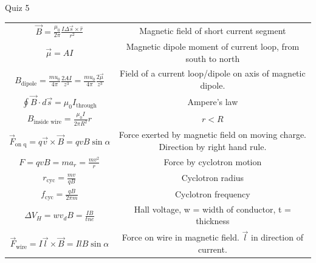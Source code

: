 \documentclass{article}
\begin{document}
\begin{center}
\begin{section}{Quiz 5}
\begin{tabular}{|c|c|}
		 $\vec B = \frac{\mu_0}{2 \pi} \frac{I \Delta \vec s \times \hat r}{r^2}$ & Magnetic field of short current segment                            \\


		 $\vec \mu = AI$                                                          & Magnetic dipole moment of current loop, from south to north        \\

		 $B_\text{dipole} = \frac{mu_0}{4 \pi} \frac{2 A I}{z^3}
		 = \frac{mu_0}{4 \pi} \frac{2 \vec \mu}{z^3}$                             & Field of a current loop/dipole on axis of magnetic dipole.         \\

		 $\oint \vec B \cdot d \vec s = \mu_0 I_\text{through}$                   & Ampere's law                                                       \\

		 $B_\text{inside wire} = \frac{\mu_0 I}{2 \pi R^2} r$                     & $r < R$                                                            \\

		 $\vec F_\text{on q} = q \vec v \times \vec B = qvB \sin \alpha $         & \makecell{Force exerted by magnetic field on moving charge.        \\
		 Direction by right hand rule. }                                                                                                               \\

		 $F = qvB = ma_r = \frac{mv^2}{r}$                                        & Force by cyclotron motion                                          \\

		 $r_\text{cyc} = \frac{mv}{qB}$                                           & Cyclotron radius                                                   \\

		 $f_\text{cyc} = \frac{qB}{2 \pi m}$                                      & Cyclotron frequency                                                \\

		 $\Delta V_H = w v_d B = \frac{IB}{tne}$                                  & Hall voltage, w = width of conductor, t = thickness                \\

		 $\vec F_\text{wire} = I \vec l \times \vec B = IlB \sin \alpha$          & Force on wire in magnetic field. $\vec l$ in direction of current. \\


\end{tabular}
\end{section}
\end{center}
\end{document}
